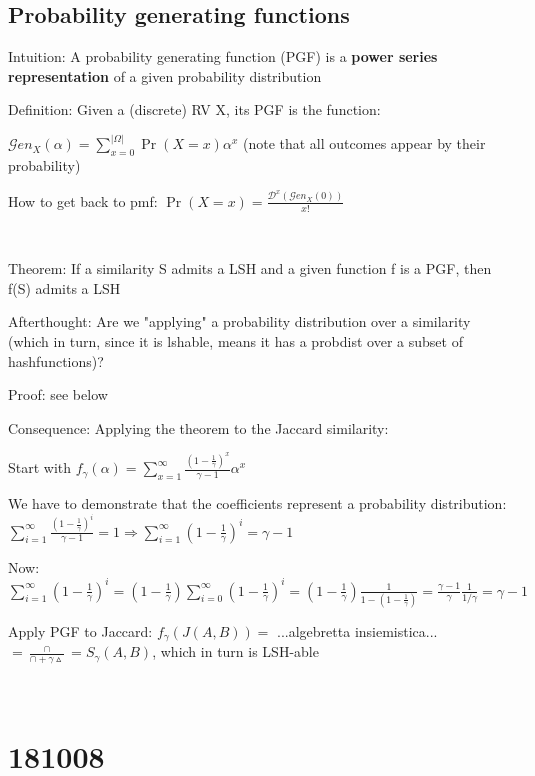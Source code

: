 \documentclass{report}
\begin{document}
	\subsection{Probability generating functions}
	
	Intuition: A probability generating function (PGF) is a \textbf{power series representation} of a given probability distribution
	
	Definition: Given a (discrete) RV X, its PGF is the function:
	
	$\displaystyle \mathcal{G}en_X(\alpha)= \sum_{x=0}^{|\Omega|}\Pr(X=x)\alpha^x$ (note that all outcomes appear by their probability)
	
	How to get back to pmf: $\displaystyle \Pr(X=x) = \frac{\mathcal{D}^x(\mathcal{G}en_X(0))}{x!}$
	
	\
	
	Theorem: If a similarity S admits a LSH and a given function f is a PGF, then f(S) admits a LSH
	
	Afterthought: Are we "applying" a probability distribution over a similarity (which in turn, since it is lshable, means it has a probdist over a subset of hashfunctions)?
	
	Proof: see below
	
	Consequence: Applying the theorem to the Jaccard similarity:
	
	
	Start with $\displaystyle f_\gamma(\alpha) = \sum_{x=1}^{\infty}\frac{(1-\frac{1}{\gamma})^x}{\gamma -1}\alpha^x$
	
	We have to demonstrate that the coefficients represent a probability distribution: $\displaystyle \sum_{i=1}^{\infty}\frac{(1-\frac{1}{\gamma})^i}{\gamma -1}=1 \Rightarrow \sum_{i=1}^{\infty}(1-\frac{1}{\gamma})^i=\gamma -1$
	
	Now: $\displaystyle \sum_{i=1}^{\infty}(1 - \frac{1}{\gamma})^i = (1 - \frac{1}{\gamma})\sum_{i=0}^{\infty}(1 - \frac{1}{\gamma})^i = (1 - \frac{1}{\gamma}) \frac{1}{1 - (1 - \frac{1}{\gamma})} = \frac{\gamma -1 }{\gamma}\frac{1}{1/\gamma} = \gamma -1$
	
	
	Apply PGF to Jaccard: $f_\gamma (J(A, B)) = $ ...algebretta insiemistica... $= \frac{\cap}{\cap + \gamma\vartriangle} = S_\gamma(A, B)$, which in turn is LSH-able
	
	
	\
	
	\section{181008}
	
\end{document}
